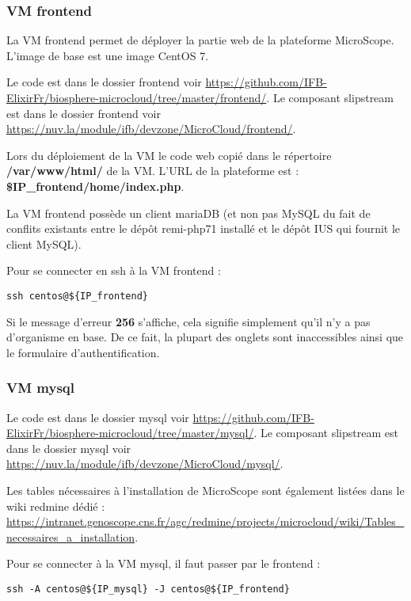 \subsubsection {VM frontend}\label{frontend}

La VM frontend permet de déployer la partie web de la plateforme MicroScope.
L'image de base est une image CentOS 7.

Le code est dans le dossier frontend voir \url{https://github.com/IFB-ElixirFr/biosphere-microcloud/tree/master/frontend/}.
Le composant slipstream est dans le dossier frontend voir \url{https://nuv.la/module/ifb/devzone/MicroCloud/frontend/}.

Lors du déploiement de la VM le code web copié dans le répertoire \textbf{/var/www/html/} de la VM.
L'URL de la plateforme est : \textbf{\$IP\_frontend/home/index.php}.

La VM frontend possède un client mariaDB (et non pas MySQL du fait de conflits existants entre le dépôt remi-php71 installé et le dépôt IUS qui fournit le client MySQL).\newline

Pour se connecter en ssh à la VM frontend : 
\begin{lstlisting}[style=Bash]
ssh centos@${IP_frontend}
\end{lstlisting}

\begin{mycolorbox}Si le message d’erreur \textbf{256} s’affiche, cela signifie simplement qu’il n’y a pas d’organisme en base. De ce fait, la plupart des onglets sont inaccessibles ainsi que le formulaire d’authentification.
\end{mycolorbox}

\subsubsection {VM mysql}\label{mysql}

Le code est dans le dossier mysql voir \url{https://github.com/IFB-ElixirFr/biosphere-microcloud/tree/master/mysql/}.
Le composant slipstream est dans le dossier mysql voir \url{https://nuv.la/module/ifb/devzone/MicroCloud/mysql/}.

Les tables nécessaires à l'installation de MicroScope sont également listées dans le wiki redmine dédié : \url{https://intranet.genoscope.cns.fr/agc/redmine/projects/microcloud/wiki/Tables_necessaires_a_installation}.
\newline

Pour se connecter à la VM mysql, il faut passer par le frontend :
\begin{lstlisting}[style=bash]
ssh -A centos@${IP_mysql} -J centos@${IP_frontend}
\end{lstlisting}
\bigskip

